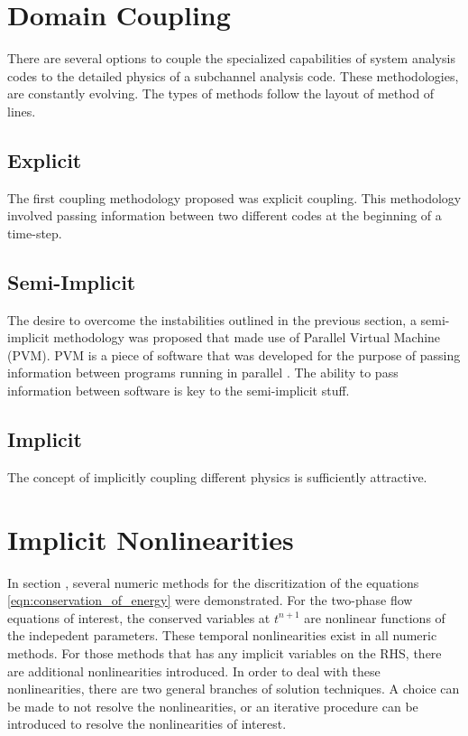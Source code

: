 \section{Domain Coupling}
\label{sect:code_coupling}
There are several options to couple the specialized capabilities of system analysis codes to the detailed physics of a subchannel analysis code.
These methodologies, are constantly evolving.
The types of methods follow the layout of method of lines.

\subsection{Explicit}
\label{subsect:coupling_explicit}
The first coupling methodology proposed was explicit coupling.
This methodology involved passing information between two different codes at the beginning of a time-step.


\subsection{Semi-Implicit}
\label{subsect:coupling_semi_implicit}
The desire to overcome the instabilities outlined in the previous section, a semi-implicit methodology was proposed that made use of Parallel Virtual Machine (PVM).
PVM is a piece of software that was developed for the purpose of passing information between programs running in parallel \citet{someone}. 
The ability to pass information between software is key to the semi-implicit stuff. 

\subsection{Implicit}
\label{subsect:coupling_implicit}
The concept of implicitly coupling different physics is sufficiently attractive. 


\section{Implicit Nonlinearities}
\label{sect:nonlinearities}
In section , several numeric methods for the discritization of the equations \eqref{eqn:conservation_of_energy} were demonstrated.
For the two-phase flow equations of interest, the conserved variables at $t^{n+1}$ are nonlinear functions of the indepedent parameters.
These temporal nonlinearities exist in all numeric methods.
For those methods that has any implicit variables on the RHS, there are additional nonlinearities introduced.
In order to deal with these nonlinearities, there are two general branches of solution techniques.
A choice can be made to not resolve the nonlinearities, or an iterative procedure can be introduced to resolve the nonlinearities of interest.

